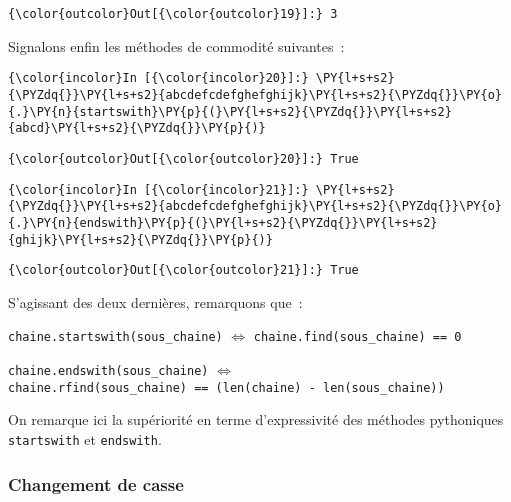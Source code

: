 \begin{Verbatim}[commandchars=\\\{\}]
{\color{outcolor}Out[{\color{outcolor}19}]:} 3
\end{Verbatim}
            
    Signalons enfin les méthodes de commodité suivantes~:

    \begin{Verbatim}[commandchars=\\\{\}]
{\color{incolor}In [{\color{incolor}20}]:} \PY{l+s+s2}{\PYZdq{}}\PY{l+s+s2}{abcdefcdefghefghijk}\PY{l+s+s2}{\PYZdq{}}\PY{o}{.}\PY{n}{startswith}\PY{p}{(}\PY{l+s+s2}{\PYZdq{}}\PY{l+s+s2}{abcd}\PY{l+s+s2}{\PYZdq{}}\PY{p}{)}
\end{Verbatim}


\begin{Verbatim}[commandchars=\\\{\}]
{\color{outcolor}Out[{\color{outcolor}20}]:} True
\end{Verbatim}
            
    \begin{Verbatim}[commandchars=\\\{\}]
{\color{incolor}In [{\color{incolor}21}]:} \PY{l+s+s2}{\PYZdq{}}\PY{l+s+s2}{abcdefcdefghefghijk}\PY{l+s+s2}{\PYZdq{}}\PY{o}{.}\PY{n}{endswith}\PY{p}{(}\PY{l+s+s2}{\PYZdq{}}\PY{l+s+s2}{ghijk}\PY{l+s+s2}{\PYZdq{}}\PY{p}{)}
\end{Verbatim}


\begin{Verbatim}[commandchars=\\\{\}]
{\color{outcolor}Out[{\color{outcolor}21}]:} True
\end{Verbatim}
            
    S'agissant des deux dernières, remarquons que~:

    \texttt{chaine.startswith(sous\_chaine)} \(\Longleftrightarrow\)
\texttt{chaine.find(sous\_chaine)\ ==\ 0}

\texttt{chaine.endswith(sous\_chaine)} \(\Longleftrightarrow\)
\texttt{chaine.rfind(sous\_chaine)\ ==\ (len(chaine)\ -\ len(sous\_chaine))}

    On remarque ici la supériorité en terme d'expressivité des méthodes
pythoniques \texttt{startswith} et \texttt{endswith}.

    \hypertarget{changement-de-casse}{%
\subsubsection{Changement de casse}\label{changement-de-casse}}


